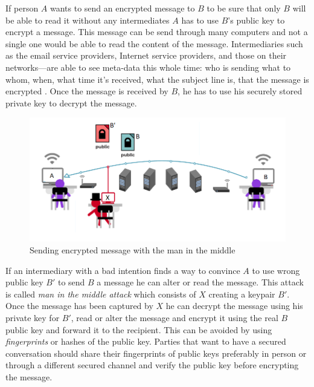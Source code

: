 If person $A$ wants to send an encrypted message to $B$ to be sure that only $B$ will be able to read it without any intermediates $A$ has to use $B$'s public key to encrypt a message. This message can be send through many computers and not a single one would be able to read the content of the message. Intermediaries such as the email service providers, Internet service providers, and those on their networks—are able to see meta-data this whole time: who is sending what to whom, when, what time it’s received, what the subject line is, that the message is encrypted  \cite{SSD.EFF.ORG}.
Once the message is received by $B$, he has to use his securely stored private key to decrypt the message. 

\begin{figure}[H]
    \begin{center}
        \begin{minipage}{\linewidth}
            \begin{center}
                \includegraphics[width=\textwidth,keepaspectratio]{img/asymetric2.png}
                \caption{Sending encrypted message with the man in the middle \cite{SSD.EFF.ORG}}
                \label{obr 1.2.1}
            \end{center}
        \end{minipage}
    \end{center}
\end{figure}

If an intermediary with a bad intention finds a way to convince $A$ to use wrong public key $B'$ to send $B$ a message he can alter or read the message. This attack is called \emph{man in the middle attack} which consists of $X$ creating a keypair $B'$. Once the message has been captured by $X$ he can decrypt the message using his private key for $B'$, read or alter the message and encrypt it using the real $B$ public key and forward it to the recipient. 
This can be avoided by using \emph{fingerprints} or hashes of the public key. Parties that want to have a secured conversation should share their fingerprints of public keys preferably in person or through a different secured channel and verify the public key before encrypting the message.

